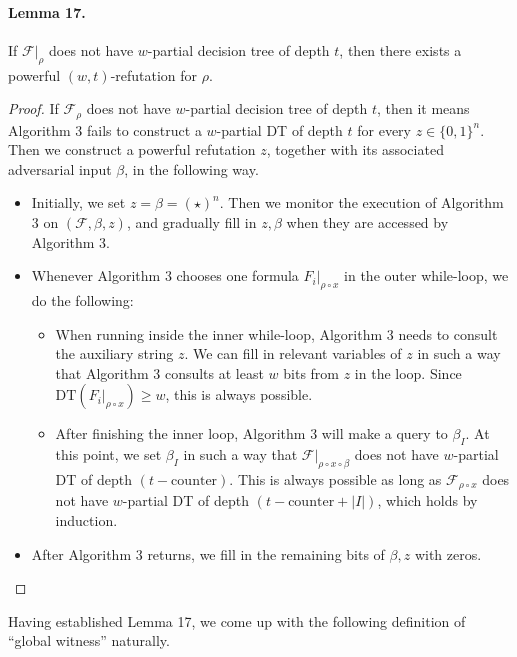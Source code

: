 \documentclass[10pt,a4paper]{article}
\begin{document}
\paragraph{Lemma 17.} If $\mathcal F|_\rho$ does not have $w$-partial decision tree of depth $t$, then there exists a powerful $(w,t)$-refutation for $\rho$.
\begin{proof}If $\mathcal F_\rho$ does not have $w$-partial decision tree of depth $t$, then it means Algorithm 3 fails to construct a $w$-partial DT of depth $t$ for every $z\in\{0,1\}^n$. Then we construct a powerful refutation $z$, together with its associated adversarial input $\beta$, in the following way.
\begin{itemize}\item Initially, we set $z=\beta=(\star)^n$. Then we monitor the execution of Algorithm 3 on $(\mathcal F,\beta,z)$, and gradually fill in $z,\beta$ when they are accessed by Algorithm 3.
\item Whenever Algorithm 3 chooses one formula $F_i|_{\rho\circ x}$ in the outer while-loop, we do the following:
\begin{itemize}\item When running inside the inner while-loop, Algorithm 3 needs to consult the auxiliary string $z$. We can fill in relevant variables of $z$ in such a way that Algorithm 3 consults at least $w$ bits from $z$ in the loop. Since $\mathrm{DT}(F_i|_{\rho\circ x})\ge w$, this is always possible.
\item After finishing the inner loop, Algorithm 3 will make a query to $\beta_I$. At this point, we set $\beta_I$ in such a way that $\mathcal F|_{\rho\circ x\circ\beta}$ does not have $w$-partial DT of depth $(t-\mathrm{counter})$. This is always possible as long as $\mathcal F_{\rho\circ x}$ does not have $w$-partial DT of depth $(t-\mathrm{counter}+|I|)$, which holds by induction.\end{itemize}
\item After Algorithm 3 returns, we fill in the remaining bits of $\beta,z$ with zeros.\end{itemize}\end{proof}
Having established Lemma 17, we come up with the following definition of ``global witness'' naturally.
\end{document}
